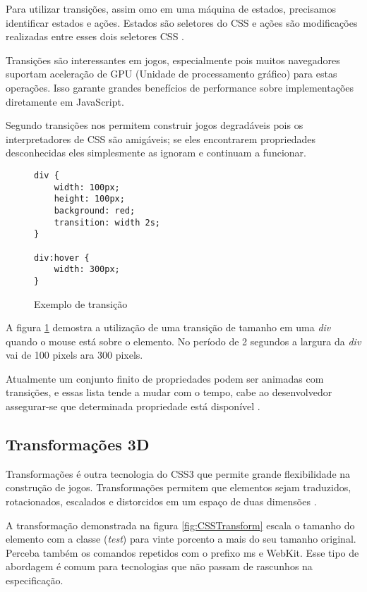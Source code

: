 Para utilizar transições, assim omo em uma máquina de estados,
precisamos identificar estados e ações. Estados são seletores do CSS
e ações são modificações realizadas entre esses dois seletores CSS
\autocite{html5mostwanted}.

Transições são interessantes em jogos, especialmente pois muitos
navegadores suportam aceleração de GPU (Unidade de processamento
gráfico) para estas operações. Isso garante grandes benefícios de
performance sobre implementações diretamente em JavaScript.

Segundo \cite{html5mostwanted} transições nos permitem construir jogos
degradáveis pois os interpretadores de CSS são amigáveis; se eles
encontrarem propriedades desconhecidas eles simplesmente as ignoram e
continuam a funcionar.

\begin{figure}[H]
\centering
\begin{verbatim}
div {
    width: 100px;
    height: 100px;
    background: red;
    transition: width 2s;
}

div:hover {
    width: 300px;
}

\end{verbatim}
\caption{Exemplo de transição}
\label{fig:CSSTransition}
\end{figure}

A figura \ref{fig:CSSTransition} demostra a utilização de uma
transição de tamanho em uma \textit{div} quando o mouse está sobre o
elemento. No período de 2 segundos a largura da \textit{div} vai de 100
pixels ara 300 pixels.

Atualmente um conjunto finito de propriedades podem ser animadas
com transições, e essas lista tende a mudar com o tempo, cabe ao
desenvolvedor assegurar-se que determinada propriedade está disponível
\autocite{mdnTransitions}.

\subsection{Transformações 3D}

Transformações é outra tecnologia do CSS3 que permite grande
flexibilidade na construção de jogos. Transformações permitem que
elementos sejam traduzidos, rotacionados, escalados e distorcidos em um
espaço de duas dimensões \autocite{html5mostwanted}.

A transformação demonstrada na figura \ref{fig:CSSTransform} escala o
tamanho do elemento com a classe (\textit{test}) para vinte porcento a
mais do seu tamanho original. Perceba também os comandos repetidos com
o prefixo ms e WebKit. Esse tipo de abordagem é comum para tecnologias
que não passam de rascunhos na especificação.

